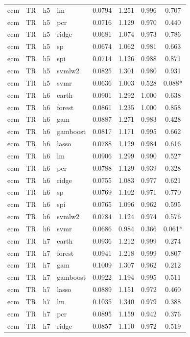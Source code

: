 \begin{ThreePartTable}
\begin{longtable}[t]{llclcccc}
ecm & TR & h5 & lm & 0.0794 & 1.251 & 0.996 & 0.707\\
ecm & TR & h5 & pcr & 0.0716 & 1.129 & 0.970 & 0.440\\
ecm & TR & h5 & ridge & 0.0681 & 1.074 & 0.973 & 0.786\\
ecm & TR & h5 & sp & 0.0674 & 1.062 & 0.981 & 0.663\\
ecm & TR & h5 & spi & 0.0714 & 1.126 & 0.988 & 0.871\\
ecm & TR & h5 & svmlw2 & 0.0825 & 1.301 & 0.980 & 0.931\\
ecm & TR & h5 & svmr & 0.0636 & 1.003 & 0.528 & 0.088*\\
\addlinespace
ecm & TR & h6 & earth & 0.0901 & 1.292 & 1.000 & 0.638\\
ecm & TR & h6 & forest & 0.0861 & 1.235 & 1.000 & 0.858\\
ecm & TR & h6 & gam & 0.0887 & 1.271 & 0.983 & 0.428\\
ecm & TR & h6 & gamboost & 0.0817 & 1.171 & 0.995 & 0.662\\
ecm & TR & h6 & lasso & 0.0788 & 1.129 & 0.984 & 0.616\\
ecm & TR & h6 & lm & 0.0906 & 1.299 & 0.990 & 0.527\\
ecm & TR & h6 & pcr & 0.0788 & 1.129 & 0.939 & 0.328\\
ecm & TR & h6 & ridge & 0.0755 & 1.083 & 0.977 & 0.621\\
ecm & TR & h6 & sp & 0.0769 & 1.102 & 0.971 & 0.770\\
ecm & TR & h6 & spi & 0.0765 & 1.096 & 0.962 & 0.595\\
ecm & TR & h6 & svmlw2 & 0.0784 & 1.124 & 0.974 & 0.576\\
ecm & TR & h6 & svmr & 0.0686 & 0.984 & 0.366 & 0.061*\\
\addlinespace
ecm & TR & h7 & earth & 0.0936 & 1.212 & 0.999 & 0.274\\
ecm & TR & h7 & forest & 0.0941 & 1.218 & 0.999 & 0.807\\
ecm & TR & h7 & gam & 0.1009 & 1.307 & 0.962 & 0.212\\
ecm & TR & h7 & gamboost & 0.0922 & 1.194 & 0.995 & 0.511\\
ecm & TR & h7 & lasso & 0.0889 & 1.151 & 0.972 & 0.460\\
ecm & TR & h7 & lm & 0.1035 & 1.340 & 0.979 & 0.388\\
ecm & TR & h7 & pcr & 0.0895 & 1.159 & 0.942 & 0.376\\
ecm & TR & h7 & ridge & 0.0857 & 1.110 & 0.972 & 0.519\\

\end{longtable}
\end{ThreePartTable}
